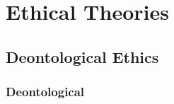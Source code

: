 \documentclass[aspectratio=169, 10pt]{beamer}
\begin{document}
\section{Ethical Theories}
\subsection{Deontological Ethics}
\begin{frame}
\frametitle{Deontological}
\end{frame}
\end{document}
